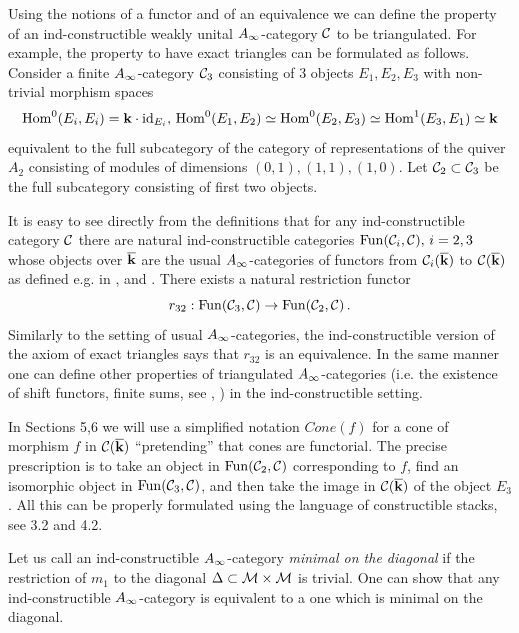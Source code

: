 \documentclass[12pt]{article}
\begin{document}
 Using the notions of a functor and of an  equivalence we can define the
  property of an ind-constructible weakly unital $A_{\infty}$-category $\cal C$ to be triangulated.
  For example, the property to have exact triangles can be formulated as follows.
  Consider a finite $A_{\infty}$-category ${\cal C}_3$ consisting of $3$ objects $E_1,E_2,E_3$ with non-trivial morphism spaces 
  $$\operatorname{Hom}^0(E_i,E_i)={\bf k}\cdot \operatorname{id}_{E_i},\,\operatorname{Hom}^0(E_1,E_2)\simeq \operatorname{Hom}^0(E_2,E_3)\simeq \operatorname{Hom}^1(E_3,E_1)\simeq {\bf k}$$
  equivalent to the full subcategory of the category of representations of the quiver $A_2$ 
  consisting of modules of dimensions $(0,1),(1,1),(1,0)$.
  Let ${\cal C}_2\subset {\cal C}_3$ be the full subcategory consisting of first two objects.
  
  It is easy to see directly from the definitions that for any ind-constructible 
  category $\cal C$ there are natural ind-constructible categories $\operatorname{Fun}({\cal C}_i,{\cal C}),\,i=2,3$ whose objects over $\overline{{\bf k}}$ are the usual $A_{\infty}$-categories of functors
   from ${\cal C}_i(\overline{{\bf k}})$ to ${\cal C}(\overline{{\bf k}})$ as defined e.g. in \cite{KoSo2},\cite{KoSo3} and \cite{Kel}. There exists a natural restriction functor
   $$r_{32}:\operatorname{Fun}({\cal C}_3,{\cal C}) \to\operatorname{Fun}({\cal C}_2,{\cal C})\,.$$
   Similarly to the setting of usual $A_{\infty}$-categories,  the ind-constructible version of the axiom of exact triangles says that $r_{32}$
   is an equivalence. In the same manner one can define other properties of triangulated $A_{\infty}$-categories (i.e.  the existence of shift functors, finite sums,  see \cite{KoSo3}, \cite{So1}) in the ind-constructible setting.
   

In Sections 5,6 we will use a simplified notation $Cone(f)$ for a cone of morphism $f$ in ${\mathcal C}({\overline{\bf k}})$ ``pretending'' that cones are 
functorial. The precise prescription is to 
 take an object in $\operatorname{Fun}({\cal C}_2,{\cal C})$ corresponding to $f$, find an isomorphic object in $\operatorname{Fun}({\cal C}_3,{\cal C})$, and then take
the image in ${\mathcal C}({\overline{\bf k}})$ of the object $E_3$. All this can be properly formulated using the language of constructible stacks, see 3.2 and 4.2.





Let us call an ind-constructible $A_{\infty}$-category {\it minimal on the diagonal} if the restriction
of $m_1$ to the diagonal $\Delta\subset {\cal M}\times {\cal M}$ is trivial.
One can show that any ind-constructible $A_{\infty}$-category is equivalent to a one which is minimal on the diagonal.
\end{document}
